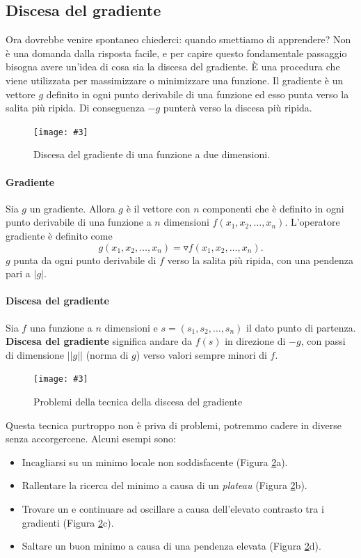 \documentclass[12pt, twoside, letterpaper]{report}
\newcommand{\img}[4] {
	\begin{figure}
		\centering
		\texttt{[image: \#3]}\\
		\caption{#1}
		\label{#4}
	\end{figure}
}
\begin{document}
			
			\subsection{Discesa del gradiente}
				Ora dovrebbe venire spontaneo chiederci: quando smettiamo di apprendere? Non è una domanda dalla risposta facile, e per capire questo fondamentale passaggio bisogna avere un'idea di cosa sia la discesa del gradiente. È una procedura che viene utilizzata per massimizzare o minimizzare una funzione. Il gradiente è un vettore $g$ definito in ogni punto derivabile di una funzione ed esso punta verso la salita più ripida. Di conseguenza $-g$ punterà verso la discesa più ripida.
				\img{Discesa del gradiente di una funzione a due dimensioni. \cite{kriesel}}{0.5}{gradient_descent_2d.png}{gradient_descent}

				\paragraph{Gradiente} Sia $g$ un gradiente. Allora $g$ è il vettore con $n$ componenti che è definito in ogni punto derivabile di una funzione a $n$ dimensioni $f(x_1, x_2, \dots, x_n)$. L'operatore gradiente è definito come $$g(x_1, x_2, \dots, x_n) = \triangledown f(x_1, x_2, \dots, x_n).$$
					$g$ punta da ogni punto derivabile di $f$ verso la salita più ripida, con una pendenza pari a $|g|$. \cite{kriesel}
				
				\paragraph{Discesa del gradiente} Sia $f$ una funzione a $n$ dimensioni e $s=(s_1, s_2, \dots, s_n)$ il dato punto di partenza. \textbf{Discesa del gradiente} significa andare da $f(s)$ in direzione di $-g$, con passi di dimensione $||g||$ (norma di $g$) verso valori sempre minori di $f$. \cite{kriesel}
				
				\img{Problemi della tecnica della discesa del gradiente \cite{kriesel}}{0.4}{gradient_descent.png}{gradient_descent}
				
				Questa tecnica purtroppo non è priva di problemi, potremmo cadere in diverse  senza accorgercene. Alcuni esempi sono: 
				\begin{itemize}
				 	\item Incagliarsi su un minimo locale non soddisfacente (Figura \ref{gradient_descent}a).
				 	\item Rallentare la ricerca del minimo a causa di un \textit{plateau} (Figura \ref{gradient_descent}b).
				 	\item Trovare un  e continuare ad oscillare a causa dell'elevato contrasto tra i gradienti (Figura \ref{gradient_descent}c).
				 	\item Saltare un buon minimo a causa di una pendenza elevata (Figura \ref{gradient_descent}d).
				 \end{itemize} 
				 
\end{document}
